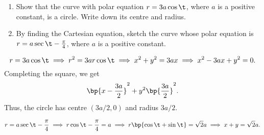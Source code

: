\clearpage
\begin{problem}
    \begin{enumerate}
        \item Show that the curve with polar equation $r = 3a\cos\t$, where $a$ is a positive constant, is a circle. Write down its centre and radius.
        \item By finding the Cartesian equation, sketch the curve whose polar equation is $r = a\sec{\t - \frac\pi4}$, where $a$ is a positive constant.
    \end{enumerate}
\end{problem}
\begin{solution}
    \begin{ppart}
        \[r = 3a\cos\t \implies r^2 = 3a r\cos\t \implies x^2 + y^2 = 3ax \implies x^2 - 3ax + y^2 = 0.\] Completing the square, we get \[\bp{x - \frac{3a}2}^2 + y^2  \bp{\frac{3a}{2}}^2.\] Thus, the circle has centre $(3a/2, 0)$ and radius $3a/2$.
    \end{ppart}
    \begin{ppart}
        \[r = a\sec{\t - \frac\pi4} \implies r\cos{\t - \frac\pi4} = a \implies r\bp{\cos\t + \sin\t} = \sqrt2 a \implies x + y = \sqrt2 a.\]

        \begin{center}
        \end{center}
    \end{ppart}
\end{solution}

